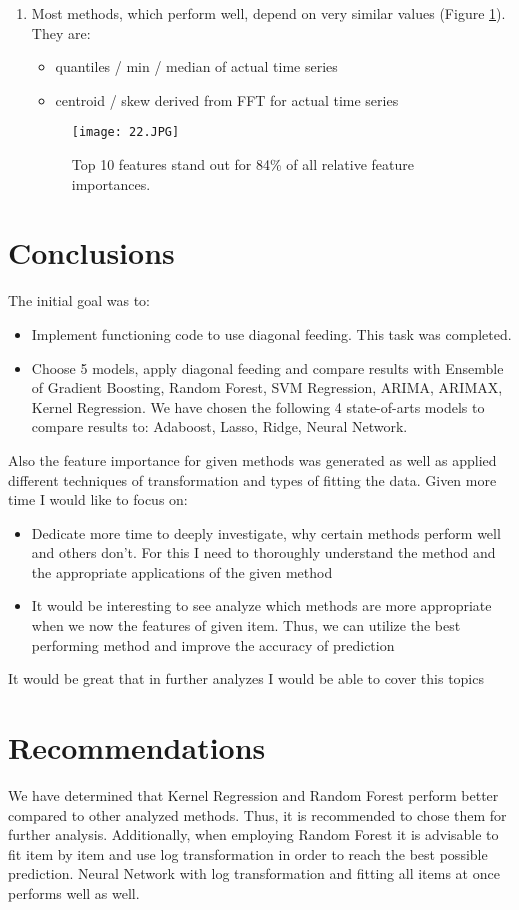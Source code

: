 \documentclass{article}
\begin{document}
\begin{enumerate}
\item  Most methods, which perform well, depend on very similar values (Figure \ref{fig:most_methods_which_perform}). They are:
\begin{itemize}
\item quantiles / min / median of actual time series
\item centroid / skew derived from FFT for actual time series
\end{itemize}
\begin{figure}[H]
\texttt{[image: 22.JPG]}
\centering
\caption{Top 10 features stand out for 84\% of all relative feature importances.}
\label{fig:most_methods_which_perform}
\end{figure}

\end{enumerate}

\section{Conclusions}
The initial goal was to:
\begin{itemize}
\item Implement functioning code to use diagonal feeding. This task was completed.
\item Choose 5 models, apply diagonal feeding and compare results with Ensemble of Gradient Boosting, Random Forest, SVM Regression, ARIMA, ARIMAX, Kernel Regression. We have chosen the following 4 state-of-arts models to compare results to: Adaboost, Lasso, Ridge, Neural Network.
\end{itemize}
Also the feature importance for given methods was generated as well as applied different techniques of transformation and types of fitting the data. 
Given more time I would like to focus on:
\begin{itemize}
\item Dedicate more time to deeply investigate, why certain methods perform well and others don't. For this I need to thoroughly understand the method and the appropriate applications of the given method
\item It would be interesting to see analyze which methods are more appropriate when we now the features of given item. Thus, we can utilize the best performing method and improve the accuracy of prediction
\end{itemize}
It would be great that in further analyzes I would be able to cover this topics
\section{Recommendations}
We have  determined that Kernel Regression and Random Forest perform better compared to other analyzed methods. Thus, it is recommended to chose them for further analysis. 
Additionally, when employing Random Forest it is advisable to fit item by item and use log transformation in order to reach the best possible prediction. 
Neural Network with log transformation and fitting all items at once performs well as well. 
\end{document}
